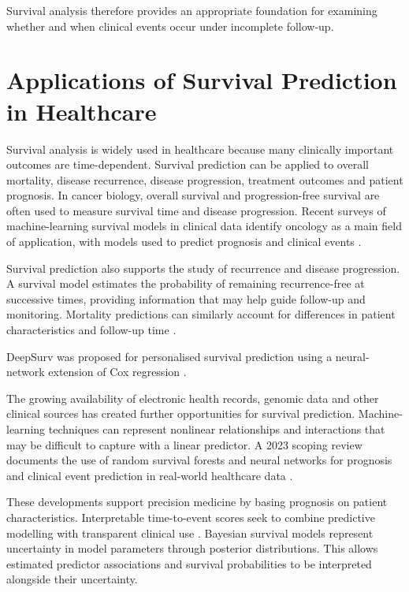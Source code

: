Survival analysis therefore provides an appropriate foundation for examining whether and when clinical events occur under incomplete follow-up.

\section{Applications of Survival Prediction in Healthcare}\label{applications-of-survival-prediction-in-healthcare}

Survival analysis is widely used in healthcare because many clinically important outcomes are time-dependent. Survival prediction can be applied to overall mortality, disease recurrence, disease progression, treatment outcomes and patient prognosis. In cancer biology, overall survival and progression-free survival are often used to measure survival time and disease progression. Recent surveys of machine-learning survival models in clinical data identify oncology as a main field of application, with models used to predict prognosis and clinical events \cite{ref1}.

Survival prediction also supports the study of recurrence and disease progression. A survival model estimates the probability of remaining recurrence-free at successive times, providing information that may help guide follow-up and monitoring. Mortality predictions can similarly account for differences in patient characteristics and follow-up time \cite{ref1,ref5}.

DeepSurv was proposed for personalised survival prediction using a neural-network extension of Cox regression \cite{ref4}.

The growing availability of electronic health records, genomic data and other clinical sources has created further opportunities for survival prediction. Machine-learning techniques can represent nonlinear relationships and interactions that may be difficult to capture with a linear predictor. A 2023 scoping review documents the use of random survival forests and neural networks for prognosis and clinical event prediction in real-world healthcare data \cite{ref1}.

These developments support precision medicine by basing prognosis on patient characteristics. Interpretable time-to-event scores seek to combine predictive modelling with transparent clinical use \cite{ref2}. Bayesian survival models represent uncertainty in model parameters through posterior distributions. This allows estimated predictor associations and survival probabilities to be interpreted alongside their uncertainty.

